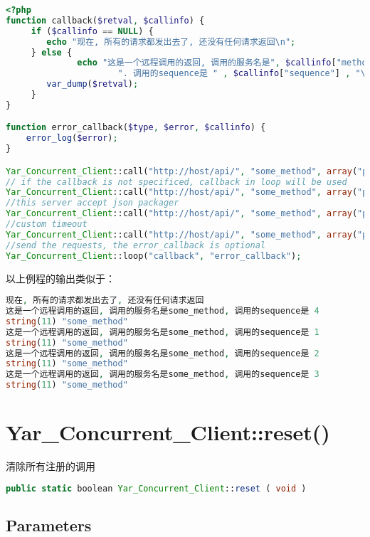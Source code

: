 \begin{lstlisting}[language=PHP]
<?php
function callback($retval, $callinfo) {
     if ($callinfo == NULL) {
        echo "现在, 所有的请求都发出去了, 还没有任何请求返回\n";
     } else {
              echo "这是一个远程调用的返回, 调用的服务名是", $callinfo["method"], 
                      ". 调用的sequence是 " , $callinfo["sequence"] , "\n";
        var_dump($retval);
     }
} 

function error_callback($type, $error, $callinfo) {
    error_log($error);
}

Yar_Concurrent_Client::call("http://host/api/", "some_method", array("parameters"), "callback");
// if the callback is not specificed, callback in loop will be used
Yar_Concurrent_Client::call("http://host/api/", "some_method", array("parameters"));   
//this server accept json packager
Yar_Concurrent_Client::call("http://host/api/", "some_method", array("parameters"), "callback", NULL, array(YAR_OPT_PACKAGER => "json"));
//custom timeout
Yar_Concurrent_Client::call("http://host/api/", "some_method", array("parameters"), "callback", NULL, array(YAR_OPT_TIMEOUT=>1));
//send the requests, the error_callback is optional
Yar_Concurrent_Client::loop("callback", "error_callback");
\end{lstlisting}

以上例程的输出类似于：


\begin{lstlisting}[language=PHP]
现在, 所有的请求都发出去了, 还没有任何请求返回
这是一个远程调用的返回, 调用的服务名是some_method, 调用的sequence是 4
string(11) "some_method"
这是一个远程调用的返回, 调用的服务名是some_method, 调用的sequence是 1
string(11) "some_method"
这是一个远程调用的返回, 调用的服务名是some_method, 调用的sequence是 2
string(11) "some_method"
这是一个远程调用的返回, 调用的服务名是some_method, 调用的sequence是 3
string(11) "some_method"
\end{lstlisting}

\section{Yar\_Concurrent\_Client::reset()}

清除所有注册的调用

\begin{lstlisting}[language=PHP]
public static boolean Yar_Concurrent_Client::reset ( void )
\end{lstlisting}

\subsection{Parameters}


